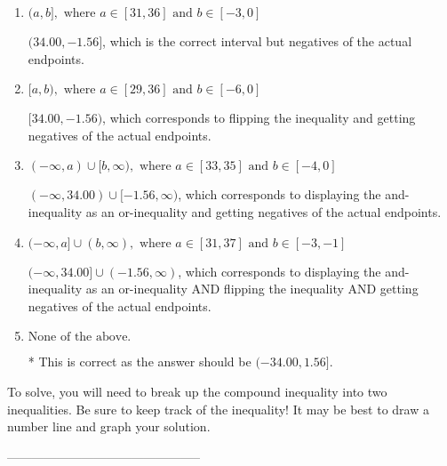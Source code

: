 \documentclass{extbook}[14pt]
\begin{document}
\begin{enumerate}[label=\Alph*.] 
\item $ (a, b], \text{ where } a \in [31, 36] \text{ and } b \in [-3, 0] $ 

 $(34.00, -1.56]$, which is the correct interval but negatives of the actual endpoints. 
\item $ [a, b), \text{ where } a \in [29, 36] \text{ and } b \in [-6, 0] $ 

 $[34.00, -1.56)$, which corresponds to flipping the inequality and getting negatives of the actual endpoints. 
\item $ (-\infty, a) \cup [b, \infty), \text{ where } a \in [33, 35] \text{ and } b \in [-4, 0] $ 

 $(-\infty, 34.00) \cup [-1.56, \infty)$, which corresponds to displaying the and-inequality as an or-inequality and getting negatives of the actual endpoints. 
\item $ (-\infty, a] \cup (b, \infty), \text{ where } a \in [31, 37] \text{ and } b \in [-3, -1] $ 

 $(-\infty, 34.00] \cup (-1.56, \infty)$, which corresponds to displaying the and-inequality as an or-inequality AND flipping the inequality AND getting negatives of the actual endpoints. 
\item $ \text{None of the above.} $ 

 * This is correct as the answer should be $(-34.00, 1.56]$. 
\end{enumerate} 
 
To solve, you will need to break up the compound inequality into two inequalities. Be sure to keep track of the inequality! It may be best to draw a number line and graph your solution.

-----------------------------------------------
\end{document}
